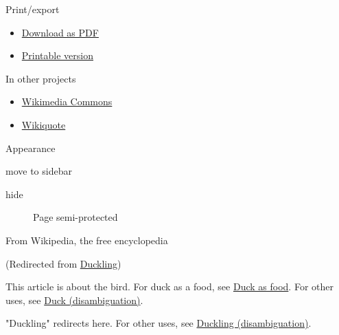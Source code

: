 \documentclass[11pt,a4paper]{article}
\begin{document}
Print/export

\begin{itemize}
\item \href{/w/index.php?title=Special:DownloadAsPdf\&page=Duck\&action=show-download-screen}{Download as PDF}
\item \href{/w/index.php?title=Duck\&printable=yes}{Printable version}
\end{itemize}

In other projects

\begin{itemize}
\item \href{https://commons.wikimedia.org/wiki/Category:Ducks}{Wikimedia Commons}
\item \href{https://en.wikiquote.org/wiki/Duck}{Wikiquote}
\end{itemize}

Appearance

move to sidebar

hide

\begin{figure}[h]
\caption{Page semi-protected}
\end{figure}

From Wikipedia, the free encyclopedia

(Redirected from \href{/w/index.php?title=Duckling\&redirect=no}{Duckling})

This article is about the bird. For duck as a food, see \href{/wiki/Duck\_as\_food}{Duck as food}. For other uses, see \href{/wiki/Duck\_\%28disambiguation\%29}{Duck (disambiguation)}.

"Duckling" redirects here. For other uses, see \href{/wiki/Duckling\_\%28disambiguation\%29}{Duckling (disambiguation)}.
\end{document}
